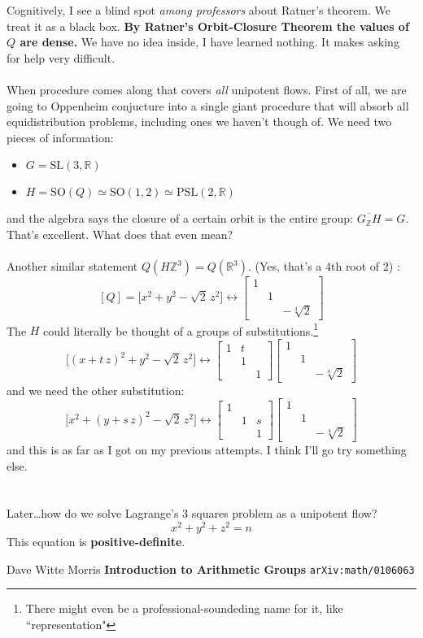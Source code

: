 \documentclass[12pt]{article}
\begin{document}
Cognitively, I see a blind spot \textit{among professors} about Ratner's theorem.  We treat it as a black box.  \textbf{By Ratner's Orbit-Closure Theorem the values of $Q$ are dense.} We have no idea inside, I have learned nothing. It makes asking for help very difficult. \\ \\
When procedure comes along that covers \textit{all} unipotent flows.  First of all, we are going to Oppenheim conjucture into a single giant procedure that will absorb all equidistribution problems, including ones we haven't though of.  We need two pieces of information:
\begin{itemize}
\item $G = \mathrm{SL}(3,\mathbb{R})$
\item $H = \mathrm{SO}(Q) \simeq \mathrm{SO}(1,2) \simeq \mathrm{PSL}(2, \mathbb{R})$
\end{itemize}
and the algebra says the closure of a certain orbit is the entire group: $\overline{G_\mathbb{Z}H}= G$.  That's excellent.  What does that even mean? \\ \\
Another similar statement $Q(H \mathbb{Z}^3) = Q(\mathbb{R}^3) $. (Yes, that's a 4th root of $2$) :
$$ [Q] = \big[ x^2 + y^2 - \sqrt{2} \, z^2  \big] \leftrightarrow \left[\begin{array}{ccc}1 & & \\ & 1 & \\ & & -\sqrt[4]{2} \end{array} \right] $$
The $H$ could literally be thought of a groups of substitutions.\footnote{There might even be a professional-soundeding name for it, like ``representation"} 
$$ \Big[ (x + t \, z)^2 + y^2 - \sqrt{2} \, z^2  \Big] \leftrightarrow 
\left[\begin{array}{ccc}1 & t & \\ & 1 & \\ & & 1 \end{array} \right]
\left[\begin{array}{ccc}1 & & \\ & 1 & \\ & & -\sqrt[4]{2} \end{array} \right] $$
and we need the other substitution:$$ \Big[ x^2 + (y + s\, z)^2 - \sqrt{2} \, z^2  \Big] \leftrightarrow 
\left[\begin{array}{ccc}1 &  & \\ & 1 & s \\ & & 1 \end{array} \right]
\left[\begin{array}{ccc}1 & & \\ & 1 & \\ & & -\sqrt[4]{2} \end{array} \right] $$
and this is as far as I got on my previous attempts.  I think I'll go try something else.
\\ \\ \\
Later\dots how do we solve Lagrange's 3 squares problem as a unipotent flow?
$$  x^2 + y^2 + z^2 = n $$
This equation is \textbf{positive-definite}.
\vfill

\begin{thebibliography}{}

\item Dave Witte Morris \textbf{Introduction to Arithmetic Groups} \texttt{arXiv:math/0106063}

\end{thebibliography}
\end{document}
